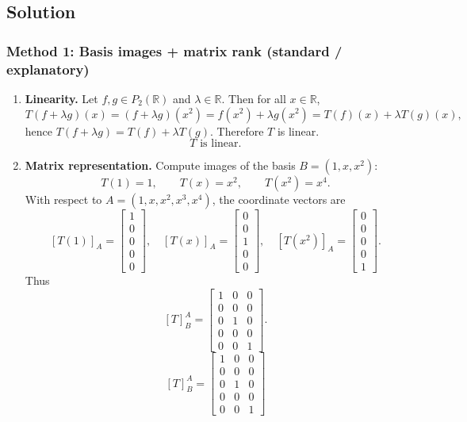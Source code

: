\documentclass[12pt]{article}
\let\amsboxed\boxed
\renewcommand{\boxed}[1]{\amsboxed{\,#1\,}}
\begin{document}
\vfill
\subsection{Solution}

\subsubsection{Method 1: Basis images + matrix rank (standard / explanatory)}
\begin{enumerate}[label=(\alph*)]
\item \textbf{Linearity.}
Let $f,g\in P_2(\mathbb{R})$ and $\lambda\in\mathbb{R}$. Then for all $x\in\mathbb{R}$,
\[
T(f+\lambda g)(x)=(f+\lambda g)(x^2)=f(x^2)+\lambda g(x^2)=T(f)(x)+\lambda T(g)(x),
\]
hence $T(f+\lambda g)=T(f)+\lambda T(g)$. Therefore $T$ is linear.
\[
\boxed{\,T\text{ is linear.}\,}
\]
\vspace{2cm}

\newpage
\item \textbf{Matrix representation.}
Compute images of the basis $B=(1,x,x^2)$:
\[
T(1)=1,\qquad T(x)=x^2,\qquad T(x^2)=x^4.
\]
With respect to $A=(1,x,x^2,x^3,x^4)$, the coordinate vectors are
\[
[T(1)]_{A}=\begin{bmatrix}1\\0\\0\\0\\0\end{bmatrix},\quad
[T(x)]_{A}=\begin{bmatrix}0\\0\\1\\0\\0\end{bmatrix},\quad
[T(x^2)]_{A}=\begin{bmatrix}0\\0\\0\\0\\1\end{bmatrix}.
\]
Thus
\[
[T]_{B}^{A}=
\begin{bmatrix}
1&0&0\\
0&0&0\\
0&1&0\\
0&0&0\\
0&0&1
\end{bmatrix}.
\]
\[
\boxed{\, [T]_{B}^{A}=
\begin{bmatrix}
1&0&0\\
0&0&0\\
0&1&0\\
0&0&0\\
0&0&1
\end{bmatrix}\,}
\]


\end{enumerate}
\end{document}
